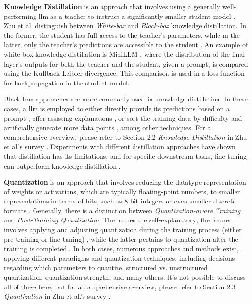 \textbf{Knowledge Distillation} is an approach that involves using a generally well-performing \gls{llm} as a teacher to instruct a significantly smaller student model \cite{hinton_distilling_2015}. Zhu et al. distinguish between \textit{White-box} and \textit{Black-box} knowledge distillation. In the former, the student has full access to the teacher's parameters, while in the latter, only the teacher's predictions are accessible to the student \cite{zhu_survey_2023}. An example of white-box knowledge distillation is MiniLLM \cite{gu_knowledge_2023}, where the distribution of the final layer's outputs for both the teacher and the student, given a prompt, is compared using the Kullback-Leibler divergence. This comparison is used in a loss function for backpropagation in the student model.

Black-box approaches are more commonly used in knowledge distillation. In these cases, a \gls{llm} is employed to either directly provide its predictions based on a prompt \cite{huang_-context_2022}, offer assisting explanations \cite{li_explanations_2022}, or sort the training data by difficulty and artificially generate more data points \cite{jiang_lion_2023}, among other techniques. For a comprehensive overview, please refer to Section 2.2 \textit{Knowledge Distillation} in Zhu et al.'s survey \cite{zhu_survey_2023}. Experiments with different distillation approaches have shown that distillation has its limitations, and for specific downstream tasks, fine-tuning can outperform knowledge distillation \cite{zhu_teach_nodate}.

\textbf{Quantization} is an approach that involves reducing the datatype representation of weights or activations, which are typically floating-point numbers, to smaller representations in terms of bits, such as 8-bit integers or even smaller discrete formats \cite{gholami_survey_2021}. Generally, there is a distinction between \textit{Quantization-aware Training} and \textit{Post-Training Quantization}. The names are self-explanatory; the former involves applying and adjusting quantization during the training process (either pre-training or fine-tuning) \cite{liu_llm-qat_2023}, while the latter pertains to quantization after the training is completed \cite{frantar_gptq_2023}. In both cases, numerous approaches and methods exist, applying different paradigms and quantization techniques, including decisions regarding which parameters to quantize, structured vs. unstructured quantization, quantization strength, and many others. It's not possible to discuss all of these here, but for a comprehensive overview, please refer to Section 2.3 \textit{Quantization} in Zhu et al.'s survey \cite{zhu_survey_2023}.

